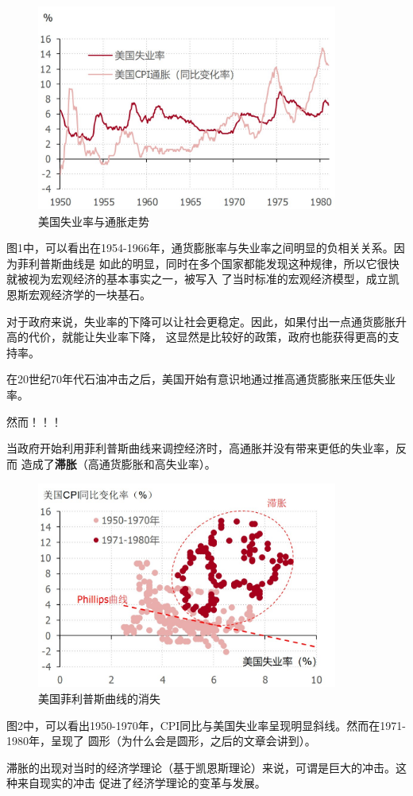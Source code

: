 \documentclass[UTF8]{article}
\begin{document}
    \begin{figure}[H]
        \centering
        \includegraphics[width=9.9cm,height=6.8cm]{美国失业率与通胀走势.jpg}
        \caption{美国失业率与通胀走势}
    \end{figure} 
    图1中，可以看出在1954-1966年，通货膨胀率与失业率之间明显的负相关关系。因为菲利普斯曲线是
    如此的明显，同时在多个国家都能发现这种规律，所以它很快就被视为宏观经济的基本事实之一，被写入
    了当时标准的宏观经济模型，成立凯恩斯宏观经济学的一块基石。\par
    对于政府来说，失业率的下降可以让社会更稳定。因此，如果付出一点通货膨胀升高的代价，就能让失业率下降，
    这显然是比较好的政策，政府也能获得更高的支持率。\par
    在20世纪70年代石油冲击之后，美国开始有意识地通过推高通货膨胀来压低失业率。\par
    然而！！！\par
    当政府开始利用菲利普斯曲线来调控经济时，高通胀并没有带来更低的失业率，反而
    造成了\textbf{滞胀}（高通货膨胀和高失业率）。\par
    \begin{figure}[H]
        \centering
        \includegraphics[width=9.9cm,height=6.8cm]{菲利普斯曲线.jpg}
        \caption{美国菲利普斯曲线的消失}
    \end{figure}
    图2中，可以看出1950-1970年，CPI同比与美国失业率呈现明显斜线。然而在1971-1980年，呈现了
    圆形（为什么会是圆形，之后的文章会讲到）。\par
    滞胀的出现对当时的经济学理论（基于凯恩斯理论）来说，可谓是巨大的冲击。这种来自现实的冲击
    促进了经济学理论的变革与发展。
\end{document}
